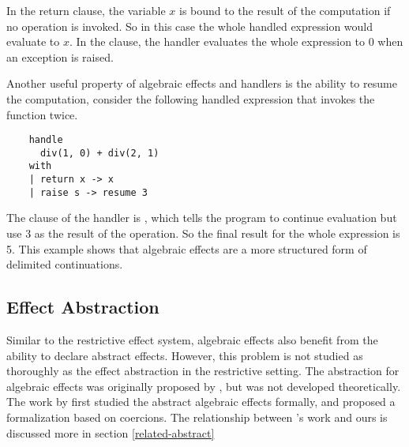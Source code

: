 In the return clause, the variable $x$ is bound to the result of the computation if no operation is invoked. So in this case the whole handled expression would evaluate to $x$. In the  clause, the handler evaluates the whole expression to 0 when an exception is raised. 

Another useful property of algebraic effects and handlers is the ability to resume the computation, consider the following handled expression that invokes the function  twice.

\begin{verbatim}
	handle 
	  div(1, 0) + div(2, 1)
	with 
	| return x -> x
	| raise s -> resume 3
\end{verbatim}

The  clause of the handler is  , which tells the program to continue evaluation but use 3 as the result of the operation. So the final result for the whole expression is 5. This example shows that algebraic effects are a more structured form of delimited continuations. 

\subsection{Effect Abstraction}
Similar to the restrictive effect system, algebraic effects also benefit from the ability to declare abstract effects. However, this problem is not studied as thoroughly as the effect abstraction in the restrictive setting. The abstraction for algebraic effects was originally proposed by \citet{leijen18}, but was not developed theoretically. The work by \citet{biernacki19} first studied the abstract algebraic effects formally, and proposed a formalization based on coercions. The relationship between \citet{biernacki19}'s work and ours is discussed more in section \ref{related-abstract}








